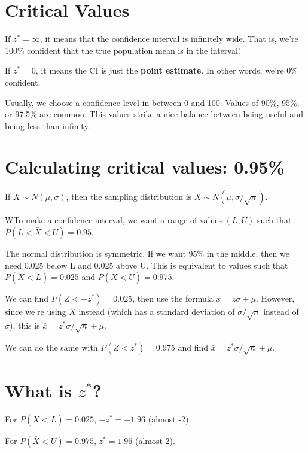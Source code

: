 \documentclass[
  letterpaper,
  DIV=11,
  numbers=noendperiod]{scrreprt}
\begin{document}
\hypertarget{critical-values}{%
\section{Critical Values}\label{critical-values}}

If \(z^* = \infty\), it means that the confidence interval is infinitely
wide. That is, we're 100\% confident that the true population mean is in
the interval!

If \(z^* = 0\), it means the CI is just the \textbf{point estimate}. In
other words, we're 0\% confident.

Usually, we choose a confidence level in between 0 and 100. Values of
90\%, 95\%, or 97.5\% are common. This values strike a nice balance
between being useful and being less than infinity.

\hypertarget{calculating-critical-values-0.95}{%
\section{Calculating critical values:
0.95\%}\label{calculating-critical-values-0.95}}

If \(X\sim N(\mu, \sigma)\), then the sampling distribution is
\(\bar X\sim N(\mu,\sigma/\sqrt{n})\).

WTo make a confidence interval, we want a range of values \((L, U)\)
such that \(P(L < \bar X < U) = 0.95\).

The normal distribution is symmetric. If we want 95\% in the middle,
then we need 0.025 below L and 0.025 above U. This is equivalent to
values such that \(P(\bar X < L) = 0.025\) and
\(P(\bar X < U) = 0.975\).

We can find \(P(Z < -z^*) = 0.025\), then use the formula
\(x = z\sigma+\mu\). However, since we're using \(\bar X\) instead
(which has a standard deviation of \(\sigma/\sqrt{n}\) instead of
\(\sigma\)), this is \(\bar x = z^*\sigma/\sqrt{n} + \mu\).

We can do the same with \(P(Z < z^*) = 0.975\) and find
\(\bar x = z^*\sigma/\sqrt n + \mu\).

\hypertarget{what-is-z}{%
\section{\texorpdfstring{What is
\(z^*\)?}{What is z\^{}*?}}\label{what-is-z}}

For \(P(\bar X < L) = 0.025\), \(-z^* = -1.96\) (almost -2).

For \(P(\bar X < U) = 0.975\), \(z^* = 1.96\) (almost 2).\newline
\end{document}
